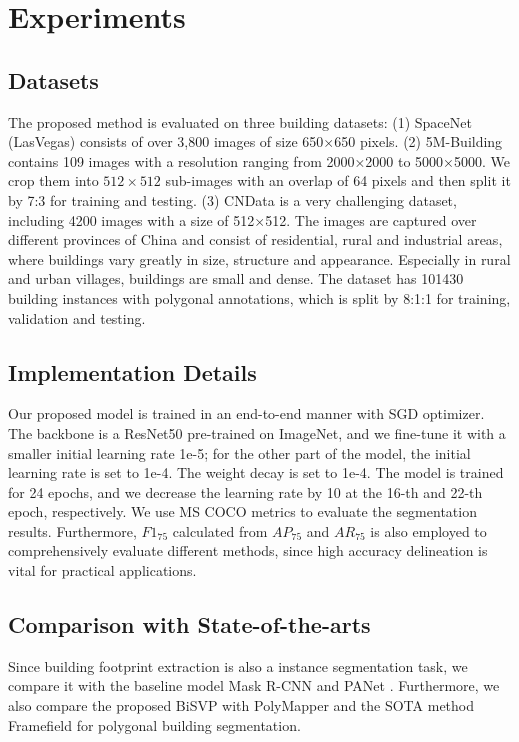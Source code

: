 \documentclass{article}
\begin{document}
\section{Experiments}
\label{sec:typestyle}
\vspace{-10pt}
\subsection{Datasets}
The proposed method is evaluated on three building datasets: (1) SpaceNet (LasVegas) \cite{van2018spacenet} consists of over 3,800 images of size 650$\times$650 pixels. (2) 5M-Building \cite{lu20195m} contains 109 images with a resolution ranging from 2000×2000 to 5000×5000. We crop them into $512\times512$ sub-images with an overlap of 64 pixels and then split it by 7:3 for training and testing. (3) CNData is a very challenging dataset, including 4200 images with a size of 512$\times$512. The images are captured over different provinces of China and consist of residential, rural and industrial areas, where buildings vary greatly in size, structure and appearance. Especially in rural and urban villages, buildings are small and dense. The dataset has 101430 building instances with polygonal annotations, which is split by 8:1:1 for training, validation and testing.
\vspace{-10pt}
\subsection{Implementation Details}
Our proposed model is trained in an end-to-end manner with SGD \cite{robbins1951sgd} optimizer. The backbone is a ResNet50 pre-trained on ImageNet, and we fine-tune it with a smaller initial learning rate 1e-5; for the other part of the model, the initial learning rate is set to 1e-4. The weight decay is set to 1e-4. The model is trained for 24 epochs, and we decrease the learning rate by 10 at the 16-th and 22-th epoch, respectively. We use MS COCO metrics \cite{lin2014mscoco} to evaluate the segmentation results. Furthermore, $F1_{75}$ calculated from $AP_{75}$ and $AR_{75}$ is also employed to comprehensively 
evaluate different methods, since high accuracy delineation is vital for practical applications.
\vspace{-10pt}
\subsection{Comparison with State-of-the-arts}
Since building footprint extraction is also a instance segmentation task, we compare it with the baseline model Mask R-CNN \cite{he2017maskrcnn} and PANet \cite{liu2018panet}. Furthermore, we also compare the proposed BiSVP with PolyMapper \cite{li2019polymapper} and the SOTA method Framefield \cite{girard2021framefield} for polygonal building segmentation.
\end{document}
